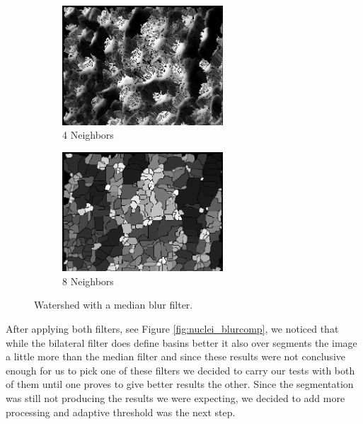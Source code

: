 \documentclass{article}
\begin{document}
\begin{figure}[H]
\centering
\begin{subfigure}{6cm}
  \centering
  \includegraphics[width=6cm]{experiments/nuclei/4Blur_nucleiseg.png}
  \caption{4 Neighbors}
\end{subfigure}    
\begin{subfigure}{6cm}
  \centering
  \includegraphics[width=6cm]{experiments/nuclei/8Blur_nucleiseg.png}
  \caption{8 Neighbors}
\end{subfigure}
\caption{Watershed with a median blur filter.}
\label{fig:nuclei_bluronly}
\end{figure}
\begin{flushleft}
After applying both filters, see Figure \ref{fig:nuclei_blurcomp}, we noticed that while the bilateral filter does define basins better it also over segments the image a little more than the median filter and since these results were not conclusive enough for us to pick one of these filters we decided to carry our tests with both of them until one proves to give better results the other. Since the segmentation was still not producing the results we were expecting, we decided to add more processing and adaptive threshold was the next step.
\end{flushleft}
\end{document}
